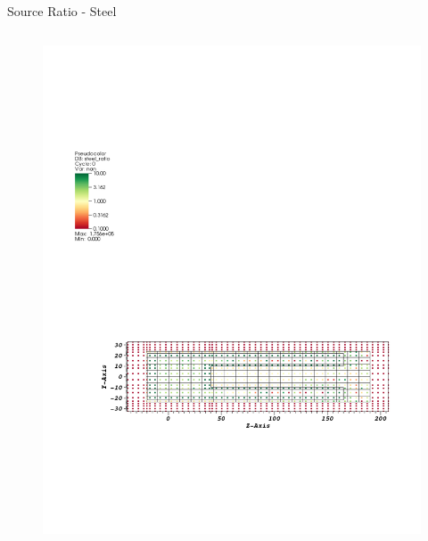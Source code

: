 \documentclass{beamer}
\begin{document}
\begin{frame}{Source Ratio - Steel}

  \begin{columns}[T]
        \begin{figure}
                \includegraphics[scale=0.5,trim={2.5cm 6cm 1cm 15cm},clip]{figs/src_ratio_steel.pdf}
        \end{figure}


\end{columns}
\end{frame}
\end{document}
